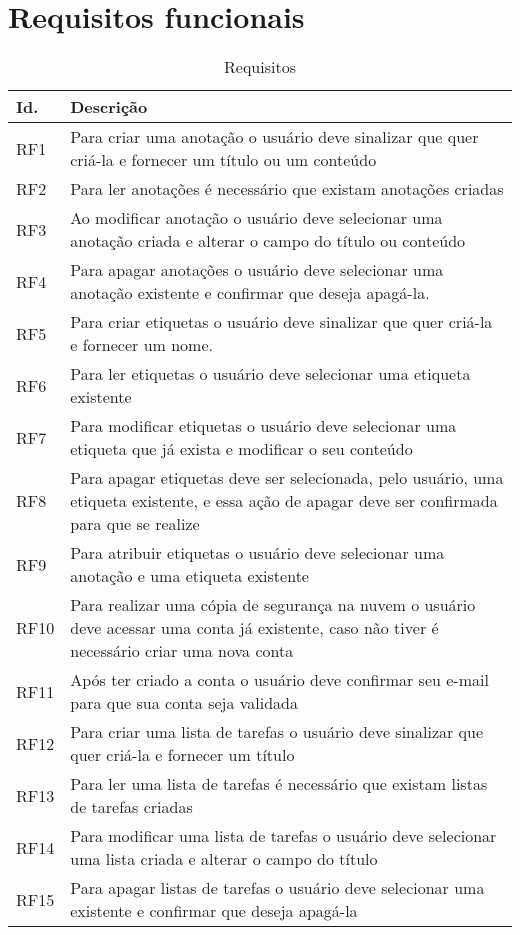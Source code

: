 \documentclass[
	12pt,				%
	oneside,			%
	a4paper,			%
	english,			%
	brazil,				%
	]{abntex2}
\begin{document}
\chapter{Requisitos funcionais}
\IBGEtabfontsize
\begin{longtable}{@{}p{}p{}@{}}
\caption{Requisitos}
\label{tab:requisitos} \\
\toprule
\textbf{Id.} & \textbf{Descrição} \\ \midrule
RF1 & Para criar uma anotação o usuário deve sinalizar que quer criá-la e fornecer um título ou um conteúdo \\ \midrule
RF2 & Para ler anotações é necessário que existam anotações criadas \\ \midrule
RF3 & Ao modificar anotação o usuário deve selecionar uma anotação criada e alterar o campo do título ou conteúdo   \\ \midrule
RF4 & Para apagar anotações o usuário deve selecionar uma anotação existente e confirmar que deseja apagá-la. \\ \midrule

RF5 & Para criar etiquetas o usuário deve sinalizar que quer criá-la e fornecer um nome. \\ \midrule
RF6 & Para ler etiquetas o usuário deve selecionar uma etiqueta existente \\ \midrule
RF7 & Para modificar etiquetas o usuário deve selecionar uma etiqueta que já exista e modificar o seu conteúdo \\ \midrule
RF8 & Para apagar etiquetas deve ser selecionada, pelo usuário, uma etiqueta existente, e essa ação de apagar deve ser confirmada para que se realize \\ \midrule
RF9 & Para atribuir etiquetas o usuário deve selecionar uma anotação e uma etiqueta existente \\ \midrule

RF10 & Para realizar uma cópia de segurança na nuvem o usuário deve acessar uma conta já existente, caso não tiver é necessário criar uma nova conta  \\ \midrule

RF11 & Após ter criado a conta o usuário deve confirmar seu e-mail para que sua conta seja validada\\ \midrule

RF12 & Para criar uma lista de tarefas o usuário deve sinalizar que quer criá-la e fornecer um título \\ \midrule
RF13 & Para ler uma lista de tarefas é necessário que existam listas de tarefas criadas \\ \midrule
RF14 & Para modificar uma lista de tarefas o usuário deve selecionar uma lista criada e alterar o campo do título \\ \midrule
RF15 & Para apagar listas de tarefas o usuário deve selecionar uma existente e confirmar que deseja apagá-la \\ \midrule


\end{longtable}
\end{document}
